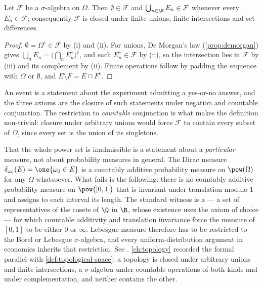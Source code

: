 \begin{proposition}\label{prop:sigma-algebra-basics}
	Let $\mathcal{F}$ be a $\sigma$-algebra on $\Omega$. Then $\emptyset\in\mathcal{F}$ and
	$\bigcup_{n\in\N}E_n\in\mathcal{F}$ whenever every $E_n\in\mathcal{F}$; consequently $\mathcal{F}$ is
	closed under finite unions, finite intersections and set differences.
\end{proposition}

\begin{proof}
	$\emptyset=\Omega^{c}\in\mathcal{F}$ by (i) and (ii). For unions, De Morgan's law
	(\autoref{prop:demorgan}) gives
	$\bigcup_nE_n=\bigl(\bigcap_nE_n^{c}\bigr)^{c}$, and each $E_n^{c}\in\mathcal{F}$ by
	(ii), so the intersection lies in $\mathcal{F}$ by (iii) and its complement by (ii).
	Finite operations follow by padding the sequence with $\Omega$ or $\emptyset$,
	and $E\setminus F=E\cap F^{c}$.
\end{proof}

An event is a statement about the experiment admitting a yes-or-no answer, and
the three axioms are the closure of such statements under negation and countable
conjunction. The restriction to \emph{countable} conjunction is what makes the
definition non-trivial: closure under arbitrary unions would force $\mathcal{F}$
to contain every subset of $\Omega$, since every set is the union of its
singletons.

That the whole power set is inadmissible is a statement about a
\emph{particular} measure, not about probability measures in general. The Dirac
measure $\delta_{\omega_0}(E)=\one\{\omega_0\in E\}$ is a countably additive
probability measure on $\pow(\Omega)$ for any $\Omega$ whatsoever. What fails is
the following: there is no countably additive probability measure on
$\pow\bigl([0,1]\bigr)$ that is invariant under translation modulo $1$ and
assigns to each interval its length. The standard witness is a  --- a set of representatives of the cosets of $\Q$ in
$\R$, whose existence uses the axiom of choice --- for which countable additivity
and translation invariance force the measure of $[0,1]$ to be either $0$ or
$\infty$. Lebesgue measure therefore has to be restricted to the Borel or
Lebesgue $\sigma$-algebra, and every uniform-distribution argument in economics
inherits that restriction. See \textcite[Ch.~1]{legall2022measure}.
\autoref{ch:topology}
recorded the formal parallel with \autoref{def:topological-space}: a topology is
closed under arbitrary unions and finite intersections, a $\sigma$-algebra under
countable operations of both kinds and under complementation, and neither
contains the other.

